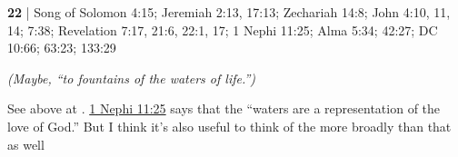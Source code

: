 	\begin{compactdesc}
	
		\item[living waters/waters of life] \textbf{22} | Song of Solomon 4:15; Jeremiah 2:13, 17:13; Zechariah 14:8; John 4:10, 11, 14; 7:38; Revelation 7:17, 21:6, 22:1, 17; 1 Nephi 11:25; Alma 5:34; 42:27; DC 10:66; 63:23; 133:29
			\begin{compactdesc}
				\item[Bible anchor verses] \phantom{.}
					\begin{compactdesc}
						\item[Jeremiah 2:13] 
						\item[Jeremiah 17:13] 
						\item[Zechariah 14:8] 
						\item[John 4:10] 
						\item[John 4:11] 
						\item[John 4:14] 
						\item[John 7:38] 
						\item[Revelation 7:17]  \textit{(Maybe, ``to fountains of the waters of life.'')}
						\item[Revelation 21:6] 
						\item[Revelation 22:1] 
						\item[Revelation 22:17] 
					\end{compactdesc}
				\item[Commentary] See above at \hyperref[HUDOR]{}. \hyperref[1NEPHI-11-25]{1 Nephi 11:25} says that the ``waters are a representation of the love of God.'' But I think it's also useful to think of the more broadly than that as well
			\end{compactdesc}
			
	\end{compactdesc}
	


